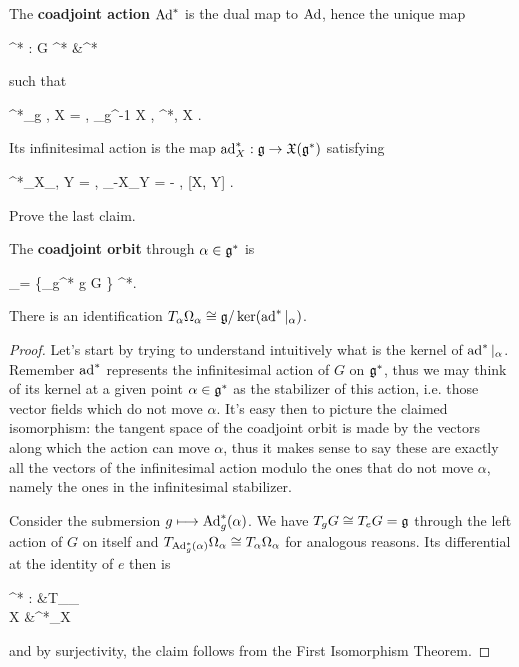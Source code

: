 \documentclass[main.tex]{subfiles}
\begin{document}
\begin{definition}
	The \textbf{coadjoint action} $\operatorname{Ad}^*$ is the dual map to $\operatorname{Ad}$, hence the unique map
	\begin{eqalign}
		\Ad^* : G \times \lalg^* &\longto \lalg^*
	\end{eqalign}
	such that
	\begin{eqalign}
		\langle \Ad^*_g \alpha, X \rangle = \langle \alpha, \Ad_{g^{-1}} X \rangle, \quad \forall \alpha \in \lalg^*, X \in \lalg.
	\end{eqalign}
	Its infinitesimal action is the map $\operatorname{ad}^*_X : \mathfrak g \to \mathfrak{X}(\mathfrak g^*)$ satisfying
	\begin{eqalign}
		\langle \ad^*_X\vert_\alpha, Y \rangle = \langle \alpha, \ad_{-X}\vert_Y \rangle = - \langle \alpha, [X, Y] \rangle.
	\end{eqalign}
\end{definition}

\begin{exercise}
	Prove the last claim.
\end{exercise}

\begin{definition}
	The \textbf{coadjoint orbit} through $\alpha \in \mathfrak g^*$ is
	\begin{eqalign}
		\Omega_\alpha = \{\Ad_g^* \alpha \suchthat g \in G \} \subseteq \lalg^*.
	\end{eqalign}
\end{definition}

\begin{theorem}
\label{th:coadj_is_tangent}
	There is an identification $T_\alpha \Omega_\alpha \overset{}{\cong} \mathfrak g / \ker (\operatorname{ad}^*\vert_\alpha)$.
\end{theorem}
\begin{proof}
	Let's start by trying to understand intuitively what is the kernel of $\operatorname{ad}^*\vert_\alpha$. Remember $\operatorname{ad}^*$ represents the infinitesimal action of $G$ on $\mathfrak g^*$, thus we may think of its kernel at a given point $\alpha \in \mathfrak g^*$ as the stabilizer of this action, i.e. those vector fields which do not move $\alpha$. It's easy then to picture the claimed isomorphism: the tangent space of the coadjoint orbit is made by the vectors along which the action can move $\alpha$, thus it makes sense to say these are exactly all the vectors of the infinitesimal action modulo the ones that do not move $\alpha$, namely the ones in the infinitesimal stabilizer.

	Consider the submersion $g \longmapsto \operatorname{Ad}_g^*(\alpha)$. We have $T_g G \overset{}{\cong} T_e G = \mathfrak g$ through the left action of $G$ on itself and $T_{\operatorname{Ad}_g^*(\alpha)}\Omega_\alpha \overset{}{\cong} T_\alpha \Omega_\alpha$ for analogous reasons.
	Its differential at the identity of $e$ then is
	\begin{eqalign}
		\ad^* : \lalg &\longto T_\alpha \Omega_\alpha\\
		X &\longmapsto \ad^*_X
	\end{eqalign}
	and by surjectivity, the claim follows from the First Isomorphism Theorem.
\end{proof}
\end{document}
